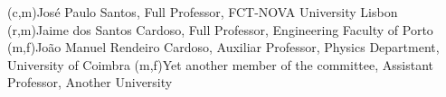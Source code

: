 (c,m){José Paulo Santos, Full Professor, FCT-NOVA University Lisbon}
(r,m){Jaime dos Santos Cardoso, Full Professor, Engineering Faculty of Porto}
(m,f){João Manuel Rendeiro Cardoso, Auxiliar Professor, Physics Department, University of Coimbra}
(m,f){Yet another member of the committee, Assistant Professor, Another University}

